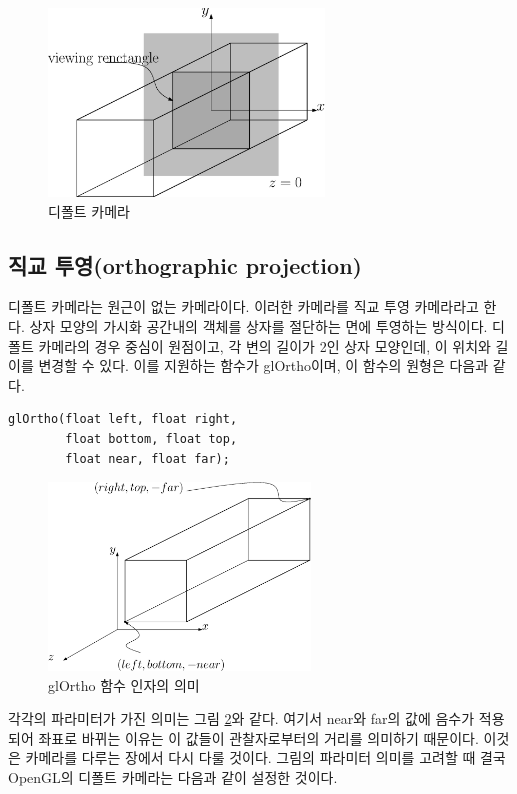 \begin{figure}[h!]
  \centering
    \includegraphics[height=5cm]{OGL_opengl/defaultCam.eps}
    \caption{디폴트 카메라}
    \label{fig:OGL_opengl:defaultCam}
\end{figure}


\subsection{직교 투영(orthographic projection)}

디폴트 카메라는 원근이 없는 카메라이다. 이러한 카메라를 직교 투영 카메라라고 한다. 상자 모양의 가시화 공간내의 객체를 상자를 절단하는 면에 투영하는 방식이다. 디폴트 카메라의 경우 중심이 원점이고, 각 변의 길이가 2인 상자 모양인데, 이 위치와 길이를 변경할 수 있다. 이를 지원하는 함수가 glOrtho이며, 이 함수의 원형은 다음과 같다.

\begin{verbatim}
glOrtho(float left, float right, 
        float bottom, float top, 
        float near, float far);
\end{verbatim}

\begin{figure}[h!]
  \centering
    \includegraphics[height=5cm]{OGL_opengl/glOrtho.eps}
    \caption{glOrtho 함수 인자의 의미}
    \label{fig:OGL_opengl:glOrtho}
\end{figure}

각각의 파라미터가 가진 의미는 그림 \ref{fig:OGL_opengl:glOrtho}와 같다. 
여기서 {\sf near}와 {\sf far}의 값에 음수가 적용되어 좌표로 바뀌는 이유는 이 값들이 관찰자로부터의 
거리를 의미하기 때문이다. 이것은 카메라를 다루는 장에서 다시 다룰 것이다.
그림의 파라미터 의미를 고려할 때 결국 OpenGL의 디폴트 카메라는 다음과 같이 설정한 것이다.

